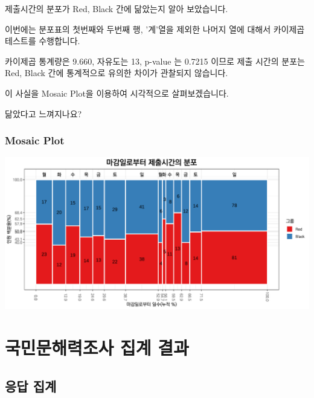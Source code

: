 \documentclass[
]{book}
\begin{document}
제출시간의 분포가 Red, Black 간에 닮았는지 알아 보았습니다.

이번에는 분포표의 첫번째와 두번째 행, '계'열을 제외한 나머지 열에 대해서 카이제곱테스트를 수행합니다.

카이제곱 통계량은 9.660, 자유도는 13, p-value 는 0.7215 이므로 제출 시간의 분포는 Red, Black 간에 통계적으로 유의한 차이가 관찰되지 않습니다.

이 사실을 Mosaic Plot을 이용하여 시각적으로 살펴보겠습니다.

닮았다고 느껴지나요?

\subsection{Mosaic Plot}\label{mosaic-plot-9}

\includegraphics{Quiz_report_2025_files/figure-latex/unnamed-chunk-121-1.pdf}

\chapter{국민문해력조사 집계 결과}\label{uxad6duxbbfcuxbb38uxd574uxb825uxc870uxc0ac-uxc9d1uxacc4-uxacb0uxacfc}

\section{응답 집계}\label{uxc751uxb2f5-uxc9d1uxacc4}
\end{document}
